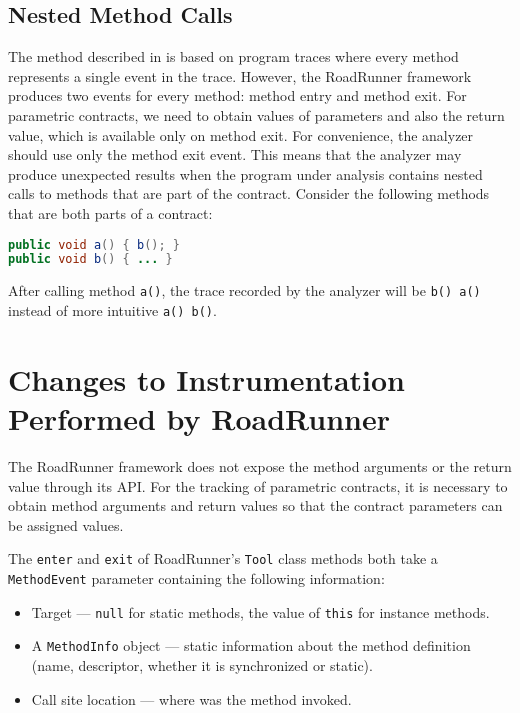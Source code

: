 \subsection{Nested Method Calls}

The method described in \cite{contracts} is based on program traces where
every method represents a single event in the trace. However, the RoadRunner
framework produces two events for every method: method entry and method exit.
For parametric contracts, we need to obtain values of parameters and also the
return value, which is available only on method exit. For convenience, the
analyzer should use only the method exit event. This means that the analyzer may
produce unexpected results when the program under analysis contains nested calls
to methods that are part of the contract. Consider the following methods that
are both parts of a contract:

\begin{lstlisting}[language=java]
public void a() { b(); }
public void b() { ... }
\end{lstlisting}

After calling method \texttt{a()}, the trace recorded by the analyzer will be
\texttt{b() a()} instead of more intuitive \texttt{a() b()}.

\section{Changes to Instrumentation Performed by RoadRunner}
\label{instrChanges}

The RoadRunner framework does not expose the method arguments or the return
value through its API. For the tracking of parametric contracts, it is necessary
to obtain method arguments and return values so that the contract parameters
can be assigned values.

The \texttt{enter} and \texttt{exit} of RoadRunner's \texttt{Tool} class methods
both take a \texttt{MethodEvent} parameter containing the following information:
\begin{itemize}
    \item Target --- \texttt{null} for static methods, the value of \texttt{this}
        for instance methods.
    \item A \texttt{MethodInfo} object --- static information about the method
        definition (name, descriptor, whether it is synchronized or static).
    \item Call site location --- where was the method invoked.
\end{itemize}

